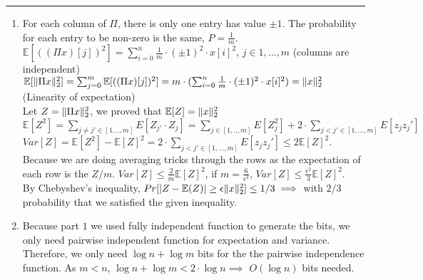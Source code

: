 \documentclass[11pt]{article}
\begin{document}




\begin{quote}

\end{quote}
\hrule


\begin{solution}
\item

\begin{enumerate}
    \item For each column of $\Pi$, there is only one entry has value $\pm 1$. The probability for each entry to be non-zero is the same, $P = \frac{1}{m}$.\\ 
    $\mathbb{E}[((\Pi x)[j])^2] = \sum_{i = 0}^{n} \frac{1}{m} \cdot (\pm 1)^2 \cdot x[i]^2 $, $j \in {1, ... ,m}$ (columns are independent)\\
    $\mathbb{E}[\mathopen\| \Pi x \mathclose\|_2^2] = \sum_{j = 0}^{m} \mathbb{E}[((\Pi x)[j])^2] = m \cdot ( \sum_{i = 0}^{n} \frac{1}{m} \cdot (\pm 1)^2 \cdot x[i]^2) = \mathopen\| x \mathclose\|_2^2$ (Linearity of expectation)\\
    
    Let $Z = \mathopen\| \Pi x \mathclose\|_2^2$, we proved that $\mathbb{E}[Z] = \mathopen\| x \mathclose\|_2^2$ \\
    
    $\mathbb{E}[Z^2] = \sum_{j \neq j' \in [1,..,m]} E[Z_{j'}\cdot Z_j] = \sum_{j \in [1,..,m]} E[Z_j^2] + 2 \cdot \sum_{j<j' \in [1,...,m]}E[z_jz_j']$\\
    
      $Var[Z] = \mathbb{E}[Z^2] - \mathbb{E}[Z]^2 = 2 \cdot \sum_{j<j' \in [1,...,m]}E[z_jz_j'] \leq 2 \mathbb{E}[Z]^2$. Because we are doing averaging tricks through the rows as the expectation of each row is the $Z/m$. $Var[Z] \leq \frac{2}{m}\mathbb{E}[Z]^2$, if $m = \frac{6}{\epsilon^2}$, $Var[Z] \leq \frac{\epsilon^2}{3}\mathbb{E}[Z]^2$. \\
    
    By Chebyshev's inequality, $Pr[|Z - \mathbb{E}(Z)| \geq \epsilon \mathopen\| x \mathclose\|_2^2] \leq 1/3 \implies$ with $2/3$ probability that we satisfied the given inequality.\\
    
    \item Because part $1$ we used fully independent function to generate the bits, we only need pairwise independent function for expectation and variance. Therefore, we only need $\log{n} + \log{m}$ bits for the the pairwise independence function. As $m < n$, $\log{n} + \log{m} < 2 \cdot \log{n} \implies$ $O(\log{n})$ bits needed.
\end{enumerate}

\end{solution}
\end{document}
